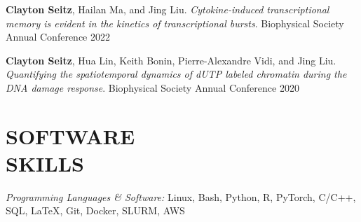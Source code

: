 \documentclass[margin, 10pt]{res} %
\begin{document}
\begin{resume}
\textbf{Clayton Seitz}, Hailan Ma, and Jing Liu. \textit{Cytokine-induced transcriptional memory is evident in the kinetics of transcriptional bursts}. Biophysical Society Annual Conference 2022


\textbf{Clayton Seitz}, Hua Lin, Keith Bonin, Pierre-Alexandre Vidi, and Jing Liu. \textit{Quantifying the spatiotemporal dynamics of dUTP labeled chromatin during the DNA damage response}. Biophysical Society Annual Conference 2020


\section{SOFTWARE \\ SKILLS} 

{\sl Programming Languages \& Software:} 
Linux, Bash, Python, R, PyTorch, C/C++, SQL, LaTeX, Git, Docker, SLURM, AWS\\

\end{resume}
\end{document}
